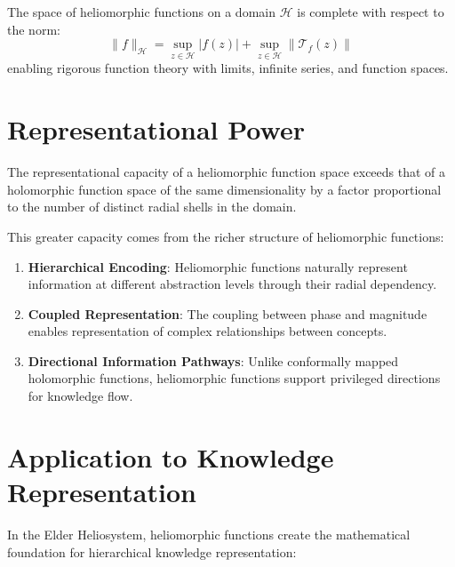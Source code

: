\begin{axiom}[Completeness]
The space of heliomorphic functions on a domain $\mathcal{H}$ is complete with respect to the norm:
\begin{equation}
\|f\|_{\mathcal{H}} = \sup_{z \in \mathcal{H}} |f(z)| + \sup_{z \in \mathcal{H}} \|\mathcal{T}_f(z)\|
\end{equation}
enabling rigorous function theory with limits, infinite series, and function spaces.
\end{axiom}

\section{Representational Power}

\begin{theorem}
The representational capacity of a heliomorphic function space exceeds that of a holomorphic function space of the same dimensionality by a factor proportional to the number of distinct radial shells in the domain.
\end{theorem}

This greater capacity comes from the richer structure of heliomorphic functions:

\begin{enumerate}
    \item \textbf{Hierarchical Encoding}: Heliomorphic functions naturally represent information at different abstraction levels through their radial dependency.
    
    \item \textbf{Coupled Representation}: The coupling between phase and magnitude enables representation of complex relationships between concepts.
    
    \item \textbf{Directional Information Pathways}: Unlike conformally mapped holomorphic functions, heliomorphic functions support privileged directions for knowledge flow.
\end{enumerate}

\section{Application to Knowledge Representation}

In the Elder Heliosystem, heliomorphic functions create the mathematical foundation for hierarchical knowledge representation:

